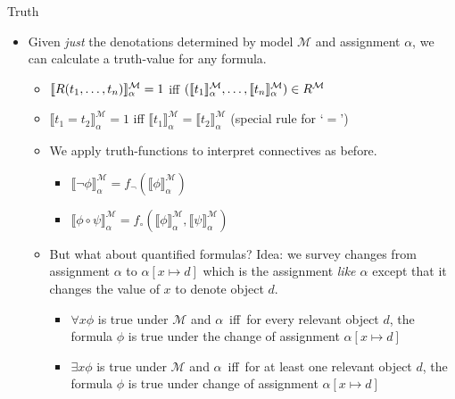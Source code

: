 \begin{frame}{Truth}

	\begin{itemize}%
	\itemsep=16pt
		
		\item Given \emph{just} the denotations determined by model $\mathcal{M}$ and assignment $\alpha$, we can calculate a truth-value for any formula.
		
		\medskip
		
		\begin{itemize}
		\itemsep=10pt
		
			 \item { $\llbracket R(t_1, \mathellipsis, t_n)\rrbracket^\mathcal{M}_\alpha=1$ iff $(\llbracket t_1\rrbracket^\mathcal{M}_\alpha, \mathellipsis, \llbracket t_n\rrbracket^\mathcal{M}_\alpha)\in R^\mathcal{M}$}
				
			\item {$\llbracket t_1=t_2\rrbracket^\mathcal{M}_\alpha=1$  iff $\llbracket t_1\rrbracket^\mathcal{M}_\alpha=\llbracket t_2\rrbracket^\mathcal{M}_\alpha$ \quad \alert{(special rule for `$=$')}}
			
			\item We apply truth-functions to interpret connectives as before.
				\begin{itemize}
			
				\item $\llbracket \neg\phi\rrbracket^\mathcal{M}_\alpha=f_\neg(\llbracket\phi\rrbracket^\mathcal{M}_\alpha)$	
			
				\item $\llbracket\phi\circ\psi\rrbracket^\mathcal{M}_\alpha=f_\circ(\llbracket\phi\rrbracket^\mathcal{M}_\alpha,\llbracket\psi\rrbracket^\mathcal{M}_\alpha)$
			
				\end{itemize}
					
			\item But what about quantified formulas? Idea: we survey changes from assignment $\alpha$ to $\alpha[x\mapsto d]$ which is the assignment \emph{like $\alpha$} except that it changes the value of $x$ to denote object $d$.

				\begin{itemize}
				
				\item $\forall x\phi$ is true under $\mathcal{M}$ and $\alpha$ \,iff\, for every relevant object $d$, the formula $\phi$ is true under the change of assignment $\alpha[x\mapsto d]$ 
				\item $\exists x\phi$ is true under $\mathcal{M}$ and $\alpha$ \,iff\, for at least one relevant object $d$, the formula $\phi$ is true under change of assignment $\alpha[x\mapsto d]$ 
		
				\end{itemize}
				
		\end{itemize}
		
	\end{itemize}

\end{frame}


